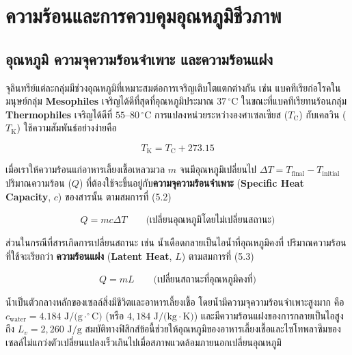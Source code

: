 \clearpage

\chapter{ความร้อนและการควบคุมอุณหภูมิชีวภาพ}

\section{อุณหภูมิ ความจุความร้อนจำเพาะ และความร้อนแฝง}

จุลินทรีย์แต่ละกลุ่มมีช่วงอุณหภูมิที่เหมาะสมต่อการเจริญเติบโตแตกต่างกัน เช่น แบคทีเรียก่อโรคในมนุษย์กลุ่ม \textbf{Mesophiles} เจริญได้ดีที่สุดที่อุณหภูมิประมาณ $37\,^\circ\text{C}$ ในขณะที่แบคทีเรียทนร้อนกลุ่ม \textbf{Thermophiles} เจริญได้ดีที่ $55\text{--}80\,^\circ\text{C}$ การแปลงหน่วยระหว่างองศาเซลเซียส ($T_{\text{C}}$) กับเคลวิน ($T_{\text{K}}$) ใช้ความสัมพันธ์อย่างง่ายคือ

\begin{equation}
    T_{\text{K}} = T_{\text{C}} + 273.15
\end{equation}

เมื่อเราให้ความร้อนแก่อาหารเลี้ยงเชื้อเหลวมวล $m$ จนมีอุณหภูมิเปลี่ยนไป $\Delta T = T_{\text{final}} - T_{\text{initial}}$ ปริมาณความร้อน ($Q$) ที่ต้องใช้จะขึ้นอยู่กับ\textbf{ความจุความร้อนจำเพาะ} (\textbf{Specific Heat Capacity}, $c$) ของสารนั้น ตามสมการที่ (5.2)

\begin{equation}
    Q = m c \Delta T \qquad \text{(เปลี่ยนอุณหภูมิโดยไม่เปลี่ยนสถานะ)}
\end{equation}

ส่วนในกรณีที่สารเกิดการเปลี่ยนสถานะ เช่น น้ำเดือดกลายเป็นไอน้ำที่อุณหภูมิคงที่ ปริมาณความร้อนที่ใช้จะเรียกว่า \textbf{ความร้อนแฝง} (\textbf{Latent Heat}, $L$) ตามสมการที่ (5.3)

\begin{equation}
    Q = m L \qquad \text{(เปลี่ยนสถานะที่อุณหภูมิคงที่)}
\end{equation}

น้ำเป็นตัวกลางหลักของเซลล์สิ่งมีชีวิตและอาหารเลี้ยงเชื้อ โดยน้ำมีความจุความร้อนจำเพาะสูงมาก คือ $c_{\text{water}} = 4.184\text{ J/(g}\cdot^\circ\text{C)}$ (หรือ $4{,}184\text{ J/(kg}\cdot\text{K)}$) และมีความร้อนแฝงของการกลายเป็นไอสูงถึง $L_v = 2{,}260\text{ J/g}$ สมบัติทางฟิสิกส์ข้อนี้ช่วยให้อุณหภูมิของอาหารเลี้ยงเชื้อและไซโทพลาซึมของเซลล์ไม่แกว่งตัวเปลี่ยนแปลงเร็วเกินไปเมื่อสภาพแวดล้อมภายนอกเปลี่ยนอุณหภูมิ

